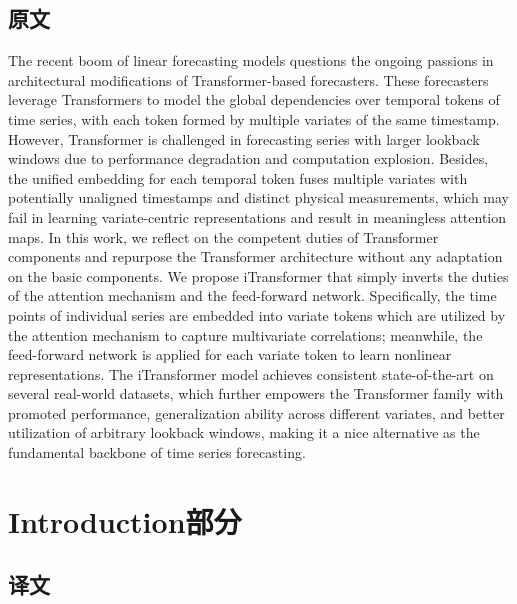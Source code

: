 \documentclass[twoside,12pt]{article}
\begin{document}
\subsection{原文}
The recent boom of linear forecasting models questions the ongoing passions in architectural modifications of Transformer-based forecasters. These forecasters leverage Transformers to model the global dependencies over temporal tokens of time series, with each token formed by multiple variates of the same timestamp. However, Transformer is challenged in forecasting series with larger lookback windows due to performance degradation and computation explosion. Besides, the unified embedding for each temporal token fuses multiple variates with potentially unaligned timestamps and distinct physical measurements, which may fail in learning variate-centric representations and result in meaningless attention maps. In this work, we reflect on the competent duties of Transformer components and repurpose the Transformer architecture without any adaptation on the basic components. We propose iTransformer that simply inverts the duties of the attention mechanism and the feed-forward network. Specifically, the time points of individual series are embedded into variate tokens which are utilized by the attention mechanism to capture multivariate correlations; meanwhile, the feed-forward network is applied for each variate token to learn nonlinear representations. The iTransformer model achieves consistent state-of-the-art on several real-world datasets, which further empowers the Transformer family with promoted performance, generalization ability across different variates, and better utilization of arbitrary lookback windows, making it a nice alternative as the fundamental backbone of time series forecasting.

\section{Introduction部分}
\subsection{译文}
\end{document}
